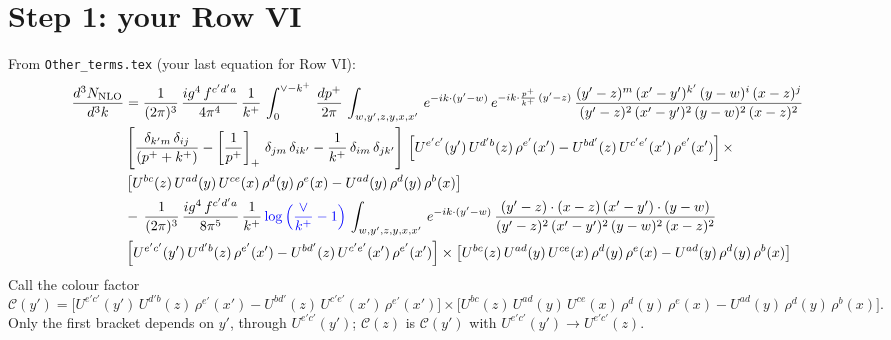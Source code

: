 \documentclass[10pt]{article}
\numberwithin{equation}{section}
\begin{document}
\section{Step 1: your Row VI}
From \texttt{Other\_terms.tex} (your last equation for Row VI):
\begin{align}
    \frac{d^{3}N_{\rm NLO}}{d^{3}k} & = \frac{1}{(2\pi)^{3}}\, \frac{ig^{4}\,f^{c'd'a}}{4\pi^{4}}\, \frac{1}{k^{+}}\,\int_{0}^{\vee-k^{+}}\, \frac{dp^{+}}{2\pi}\, \int_{w,y',z,y,x,x'}\, e^{-ik\cdot (y'-w)}\, e^{-ik\cdot \frac{p^{+}}{k^{+}}\,(y'-z)}\,\frac{(y'-z)^{m}\,(x'-y')^{k'}\,(y-w)^{i}\,(x-z)^{j}}{(y'-z)^{2}\,(x'-y')^{2}\,(y-w)^{2}\,(x-z)^{2}}\notag \\ & \left[\frac{\delta_{k'm}\,\delta_{ij}}{(p^{+}+k^{+})}-\left[\frac{1}{p^{+}}\right]_{+}\,\delta_{jm}\,\delta_{ik'}-\frac{1}{k^{+}}\, \delta_{im}\, \delta_{jk'}\right]\, \left[U^{e'c'}(y')\,U^{d'b}(z)\,\rho^{e'}(x')-U^{bd'}(z)\,U^{c'e'}(x')\,\rho^{e'}(x')\right]\times\notag \\ &  \left[U^{bc}(z)\,U^{ad}(y)\,U^{ce}(x)\,\rho^{d}(y)\,\rho^{e}(x)-U^{ad}(y)\,\rho^{d}(y)\,\rho^{b}(x)\right]\notag \\ &  -\,\frac{1}{(2\pi)^{3}}\, \frac{ig^{4}\,f^{c'd'a}}{8\pi^{5}}\, \frac{1}{k^{+}}\,{\color{blue}\log{\left(\frac{\vee}{k^{+}}-1\right)}}\, \int_{w,y',z,y,x,x'}\, e^{-ik\cdot (y'-w)}\,\frac{(y'-z)\cdot (x-z)\,(x'-y')\cdot (y-w)}{(y'-z)^{2}\,(x'-y')^{2}\,(y-w)^{2}\,(x-z)^{2}}\notag \\ & \left[U^{e'c'}(y')\,U^{d'b}(z)\,\rho^{e'}(x')-U^{bd'}(z)\,U^{c'e'}(x')\,\rho^{e'}(x')\right]\times  \left[U^{bc}(z)\,U^{ad}(y)\,U^{ce}(x)\,\rho^{d}(y)\,\rho^{e}(x)-U^{ad}(y)\,\rho^{d}(y)\,\rho^{b}(x)\right] \label{eq:userG3VI}
\end{align}
Call the colour factor
\begin{equation}
\mathcal C(y')=\Big[U^{e'c'}(y')\,U^{d'b}(z)\,\rho^{e'}(x')-U^{bd'}(z)\,U^{c'e'}(x')\,\rho^{e'}(x')\Big]\times\Big[U^{bc}(z)\,U^{ad}(y)\,U^{ce}(x)\,\rho^{d}(y)\,\rho^{e}(x)-U^{ad}(y)\,\rho^{d}(y)\,\rho^{b}(x)\Big] .
\label{eq:C}
\end{equation}
Only the first bracket depends on $y'$, through $U^{e'c'}(y')$; $\mathcal C(z)$ is $\mathcal C(y')$ with $U^{e'c'}(y')\to U^{e'c'}(z)$.
\end{document}
